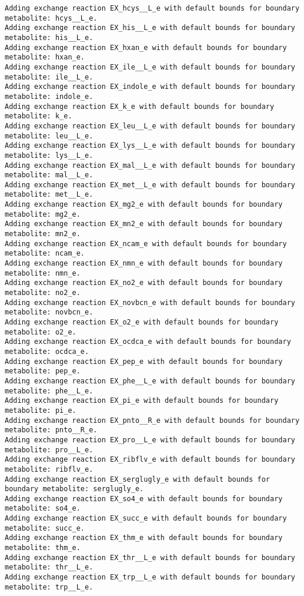 \documentclass[
  letterpaper,
  DIV=11,
  numbers=noendperiod]{scrartcl}
\begin{document}
\begin{verbatim}
Adding exchange reaction EX_hcys__L_e with default bounds for boundary metabolite: hcys__L_e.
Adding exchange reaction EX_his__L_e with default bounds for boundary metabolite: his__L_e.
Adding exchange reaction EX_hxan_e with default bounds for boundary metabolite: hxan_e.
Adding exchange reaction EX_ile__L_e with default bounds for boundary metabolite: ile__L_e.
Adding exchange reaction EX_indole_e with default bounds for boundary metabolite: indole_e.
Adding exchange reaction EX_k_e with default bounds for boundary metabolite: k_e.
Adding exchange reaction EX_leu__L_e with default bounds for boundary metabolite: leu__L_e.
Adding exchange reaction EX_lys__L_e with default bounds for boundary metabolite: lys__L_e.
Adding exchange reaction EX_mal__L_e with default bounds for boundary metabolite: mal__L_e.
Adding exchange reaction EX_met__L_e with default bounds for boundary metabolite: met__L_e.
Adding exchange reaction EX_mg2_e with default bounds for boundary metabolite: mg2_e.
Adding exchange reaction EX_mn2_e with default bounds for boundary metabolite: mn2_e.
Adding exchange reaction EX_ncam_e with default bounds for boundary metabolite: ncam_e.
Adding exchange reaction EX_nmn_e with default bounds for boundary metabolite: nmn_e.
Adding exchange reaction EX_no2_e with default bounds for boundary metabolite: no2_e.
Adding exchange reaction EX_novbcn_e with default bounds for boundary metabolite: novbcn_e.
Adding exchange reaction EX_o2_e with default bounds for boundary metabolite: o2_e.
Adding exchange reaction EX_ocdca_e with default bounds for boundary metabolite: ocdca_e.
Adding exchange reaction EX_pep_e with default bounds for boundary metabolite: pep_e.
Adding exchange reaction EX_phe__L_e with default bounds for boundary metabolite: phe__L_e.
Adding exchange reaction EX_pi_e with default bounds for boundary metabolite: pi_e.
Adding exchange reaction EX_pnto__R_e with default bounds for boundary metabolite: pnto__R_e.
Adding exchange reaction EX_pro__L_e with default bounds for boundary metabolite: pro__L_e.
Adding exchange reaction EX_ribflv_e with default bounds for boundary metabolite: ribflv_e.
Adding exchange reaction EX_serglugly_e with default bounds for boundary metabolite: serglugly_e.
Adding exchange reaction EX_so4_e with default bounds for boundary metabolite: so4_e.
Adding exchange reaction EX_succ_e with default bounds for boundary metabolite: succ_e.
Adding exchange reaction EX_thm_e with default bounds for boundary metabolite: thm_e.
Adding exchange reaction EX_thr__L_e with default bounds for boundary metabolite: thr__L_e.
Adding exchange reaction EX_trp__L_e with default bounds for boundary metabolite: trp__L_e.

\end{verbatim}
\end{document}
